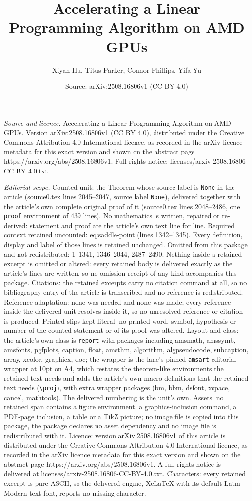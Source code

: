 \documentclass[10pt,a4paper]{amsart}
\title[Accelerating a Linear Programming Algorithm on AMD GPUs]{Accelerating a Linear Programming Algorithm on AMD GPUs}
\author{Xiyan Hu, Titus Parker, Connor Phillips, Yifa Yu}
\date{Source: arXiv:2508.16806v1 (CC BY 4.0)}
\begin{document}
\maketitle

\noindent\emph{Source and licence.} Accelerating a Linear Programming Algorithm on AMD GPUs. Version arXiv:2508.16806v1 (CC BY 4.0), distributed under the Creative Commons Attribution 4.0 International licence, as recorded in the arXiv licence metadata for this exact version and shown on the abstract page https://arxiv.org/abs/2508.16806v1. Full rights notice: licenses/arxiv-2508.16806-CC-BY-4.0.txt.\par\smallskip

\noindent\textit{Editorial scope.} Counted unit: the Theorem whose source label is \texttt{None} in the article (source0.tex lines 2045--2047, source label \texttt{None}), delivered together with the article's own complete original proof of it (source0.tex lines 2048--2486, one \texttt{proof} environment of 439 lines). No mathematics is written, repaired or re-derived: statement and proof are the article's own text line for line. Required context retained uncounted: eq:saddle-point (lines 1342--1345). Every definition, display and label of those lines is retained unchanged. Omitted from this package and not redistributed: 1--1341, 1346--2044, 2487--2490. Nothing inside a retained excerpt is omitted or altered: every retained body is delivered exactly as the article's lines are written, so no omission receipt of any kind accompanies this package. Citations: the retained excerpts carry no citation command at all, so no bibliography entry of the article is transcribed and no reference is redistributed. Reference adaptation: none was needed and none was made; every reference inside the delivered unit resolves inside it, so no unresolved reference or citation is produced. Printed slips kept literal: no printed word, symbol, hypothesis or number of the counted statement or of its proof was altered. Layout and class: the article's own class is \texttt{report} with packages including amsmath, amssymb, amsfonts, pgfplots, caption, float, amsthm, algorithm, algpseudocode, subcaption, array, xcolor, graphicx, doc; the wrapper is the lane's pinned \texttt{amsart} editorial wrapper at 10pt on A4, which restates the theorem-like environments the retained text needs and adds the article's own macro definitions that the retained text needs (\texttt{\textbackslash proj}), with extra wrapper packages (bm, bbm, dsfont, xspace, cancel, mathtools). The delivered numbering is the unit's own. Assets: no retained span contains a figure environment, a graphics-inclusion command, a PDF-page inclusion, a table or a TikZ picture; no image file is copied into this package, the package declares no asset dependency and no image file is redistributed with it. Licence: version arXiv:2508.16806v1 of this article is distributed under the Creative Commons Attribution 4.0 International licence, as recorded in the arXiv licence metadata for this exact version and shown on the abstract page https://arxiv.org/abs/2508.16806v1. A full rights notice is delivered at licenses/arxiv-2508.16806-CC-BY-4.0.txt. Characters: every retained excerpt is pure ASCII, so the delivered engine, XeLaTeX with its default Latin Modern text font, reports no missing character.
\end{document}
